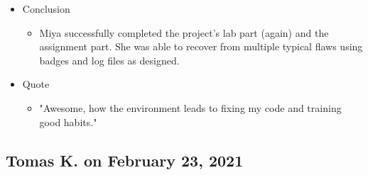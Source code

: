 \begin{itemize}
\item
  {Conclusion}
  \begin{itemize}
  \item
    {Miya successfully completed the project's lab part (again) and the assignment part. She was able to recover from multiple typical flaws using badges and log files as designed.}
  \end{itemize}

\item
  {Quote}
  \begin{itemize}
  \item
    {"Awesome, how the environment leads to fixing my code and training good habits."}
  \end{itemize}
\end{itemize}

\subsection{Tomas K. on February 23, 2021}\label{ssec:tomas0223}

